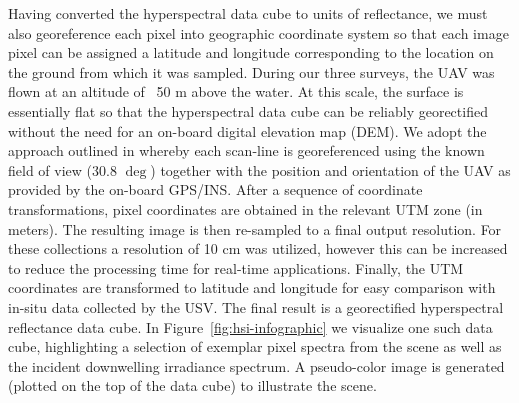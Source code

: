 \documentclass[journal,article,submit,pdftex,moreauthors]{Definitions/mdpi}
\begin{document}
Having converted the hyperspectral data cube to units of reflectance, we must also georeference each pixel into geographic coordinate system so that each image pixel can be assigned a latitude and longitude corresponding to the location on the ground from which it was sampled. During our three surveys, the UAV was flown at an altitude of ~50 m above the water. At this scale, the surface is essentially flat so that the hyperspectral data cube can be reliably georectified without the need for an on-board digital elevation map (DEM). We adopt the approach outlined in \cite{GeorectificationMuller, GeorectificationBaumker, GeorectificationMostafa} whereby each scan-line is georeferenced using the known field of view (30.8 $\deg$) together with the position and orientation of the UAV as provided by the on-board GPS/INS. After a sequence of coordinate transformations, pixel coordinates are obtained in the relevant UTM zone (in meters). The resulting image is then re-sampled to a final output resolution. For these collections a resolution of 10 cm was utilized, however this can be increased to reduce the processing time for real-time applications. Finally, the UTM coordinates are transformed to latitude and longitude for easy comparison with in-situ data collected by the USV. The final result is a georectified hyperspectral reflectance data cube. In Figure~\ref{fig:hsi-infographic} we visualize one such data cube, highlighting a selection of exemplar pixel spectra from the scene as well as the incident downwelling irradiance spectrum. A pseudo-color image is generated (plotted on the top of the data cube) to illustrate the scene.
\end{document}
